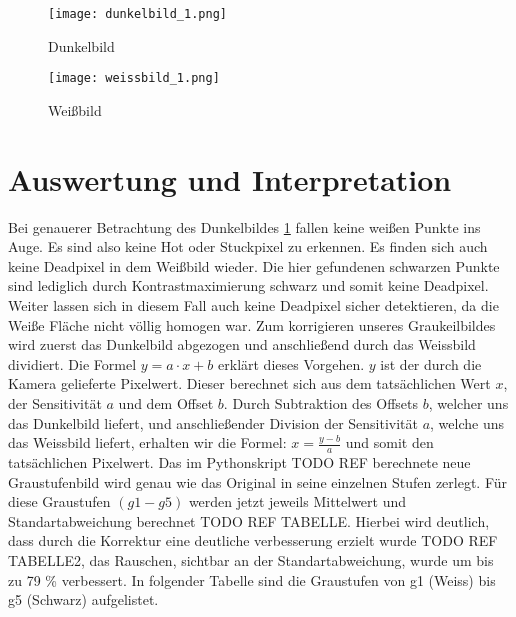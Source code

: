 \begin{figure}[H]
\centering
\texttt{[image: dunkelbild\_1.png]}
\caption{Dunkelbild}
\label{img:Dunkelbild_normal}
\end{figure}


\begin{figure}[H]
\centering
\texttt{[image: weissbild\_1.png]}
\caption{Weißbild}
\label{img:Weissbild_normal}
\end{figure}

\label{chap:VERSUCH_4_MESSWERTE}

\section{Auswertung und Interpretation}
Bei genauerer Betrachtung des Dunkelbildes \ref{img:Dunkelbild_normal} fallen keine weißen Punkte ins Auge. Es sind also keine Hot oder Stuckpixel zu erkennen. Es finden sich auch keine Deadpixel in dem Weißbild wieder. Die hier gefundenen schwarzen Punkte sind lediglich durch Kontrastmaximierung schwarz und somit keine Deadpixel. Weiter lassen sich in diesem Fall auch keine Deadpixel sicher detektieren, da die Weiße Fläche nicht völlig homogen war.
Zum korrigieren unseres Graukeilbildes wird zuerst das Dunkelbild abgezogen und anschließend durch das Weissbild dividiert. Die Formel $y = a\cdot x+b$ erklärt dieses Vorgehen. $y$ ist der durch die Kamera gelieferte Pixelwert. Dieser berechnet sich aus dem tatsächlichen Wert $x$, der Sensitivität $a$ und dem Offset $b$. Durch Subtraktion des Offsets $b$, welcher uns das Dunkelbild liefert, und anschließender Division der Sensitivität $a$, welche uns das Weissbild liefert, erhalten wir die Formel: $x = \frac{y-b}{a}$ und somit den tatsächlichen Pixelwert.
Das im Pythonskript TODO REF berechnete neue Graustufenbild wird genau wie das Original in seine einzelnen Stufen zerlegt. Für diese Graustufen $(g1 - g5)$ werden jetzt jeweils Mittelwert und Standartabweichung berechnet TODO REF TABELLE. Hierbei wird deutlich, dass durch die Korrektur eine deutliche verbesserung erzielt wurde TODO REF TABELLE2, das Rauschen, sichtbar an der Standartabweichung, wurde um bis zu 79 \% verbessert.
In folgender Tabelle sind die Graustufen von g1 (Weiss) bis g5 (Schwarz) aufgelistet.

